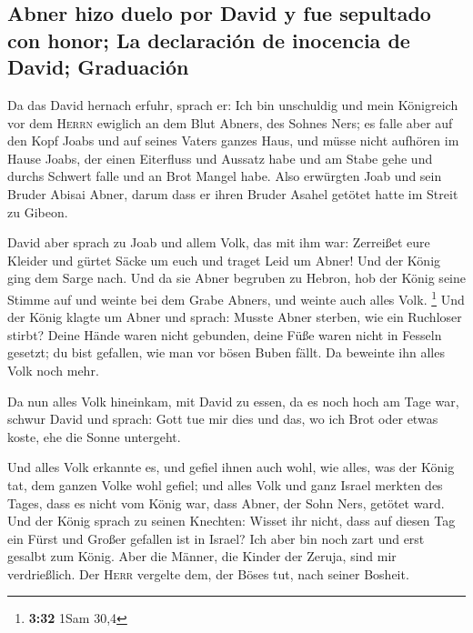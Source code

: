 \hypertarget{abner-hizo-duelo-por-david-y-fue-sepultado-con-honor-la-declaraciuxf3n-de-inocencia-de-david-graduaciuxf3n}{%
\subsection{Abner hizo duelo por David y fue sepultado con honor; La
declaración de inocencia de David;
Graduación}\label{abner-hizo-duelo-por-david-y-fue-sepultado-con-honor-la-declaraciuxf3n-de-inocencia-de-david-graduaciuxf3n}}

 Da das David hernach erfuhr, sprach er: Ich bin
unschuldig und mein Königreich vor dem \textsc{Herrn} ewiglich an dem
Blut Abners, des Sohnes Ners;  es falle aber auf den Kopf
Joabs und auf seines Vaters ganzes Haus, und müsse nicht aufhören im
Hause Joabs, der einen Eiterfluss und Aussatz habe und am Stabe gehe und
durchs Schwert falle und an Brot Mangel habe.  Also
erwürgten Joab und sein Bruder Abisai Abner, darum dass er ihren Bruder
Asahel getötet hatte im Streit zu Gibeon.

 David aber sprach zu Joab und allem Volk, das mit ihm
war: Zerreißet eure Kleider und gürtet Säcke um euch und traget Leid um
Abner! Und der König ging dem Sarge nach.  Und da sie
Abner begruben zu Hebron, hob der König seine Stimme auf und weinte bei
dem Grabe Abners, und weinte auch alles Volk. \footnote{\textbf{3:32}
  1Sam 30,4}  Und der König klagte um Abner und sprach:
Musste Abner sterben, wie ein Ruchloser stirbt?  Deine
Hände waren nicht gebunden, deine Füße waren nicht in Fesseln gesetzt;
du bist gefallen, wie man vor bösen Buben fällt. Da beweinte ihn alles
Volk noch mehr.

 Da nun alles Volk hineinkam, mit David zu essen, da es
noch hoch am Tage war, schwur David und sprach: Gott tue mir dies und
das, wo ich Brot oder etwas koste, ehe die Sonne untergeht.

 Und alles Volk erkannte es, und gefiel ihnen auch wohl,
wie alles, was der König tat, dem ganzen Volke wohl gefiel;
 und alles Volk und ganz Israel merkten des Tages, dass
es nicht vom König war, dass Abner, der Sohn Ners, getötet ward.
 Und der König sprach zu seinen Knechten: Wisset ihr
nicht, dass auf diesen Tag ein Fürst und Großer gefallen ist in Israel?
 Ich aber bin noch zart und erst gesalbt zum König. Aber
die Männer, die Kinder der Zeruja, sind mir verdrießlich. Der
\textsc{Herr} vergelte dem, der Böses tut, nach seiner Bosheit.

